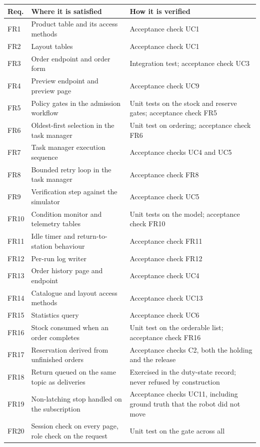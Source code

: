 \documentclass[12pt,a4paper]{report}
\begin{document}
\begin{longtable}{@{}p{}p{}p{}@{}}
\toprule
\textbf{Req.} & \textbf{Where it is satisfied} & \textbf{How it is verified} \\
\midrule
\endhead
FR1 & Product table and its access methods & Acceptance check UC1 \\
FR2 & Layout tables & Acceptance check UC1 \\
FR3 & Order endpoint and order form & Integration test; acceptance check UC3 \\
FR4 & Preview endpoint and preview page & Acceptance check UC9 \\
FR5 & Policy gates in the admission workflow & Unit tests on the stock and reserve gates;
acceptance check FR5 \\
FR6 & Oldest-first selection in the task manager & Unit test on ordering; acceptance check FR6 \\
FR7 & Task manager execution sequence & Acceptance checks UC4 and UC5 \\
FR8 & Bounded retry loop in the task manager & Acceptance check FR8 \\
FR9 & Verification step against the simulator & Acceptance check UC5 \\
FR10 & Condition monitor and telemetry tables & Unit tests on the model; acceptance check FR10 \\
FR11 & Idle timer and return-to-station behaviour & Acceptance check FR11 \\
FR12 & Per-run log writer & Acceptance check FR12 \\
FR13 & Order history page and endpoint & Acceptance check UC4 \\
FR14 & Catalogue and layout access methods & Acceptance check UC13 \\
FR15 & Statistics query & Acceptance check UC6 \\
FR16 & Stock consumed when an order completes & Unit test on the orderable list; acceptance check
FR16 \\
FR17 & Reservation derived from unfinished orders & Acceptance checks C2, both the holding and the
release \\
FR18 & Return queued on the same topic as deliveries & Exercised in the duty-state record; never
refused by construction \\
FR19 & Non-latching stop handled on the subscription & Acceptance checks UC11, including ground
truth that the robot did not move \\
FR20 & Session check on every page, role check on the request & Unit test on the gate across all

\end{longtable}
\end{document}
